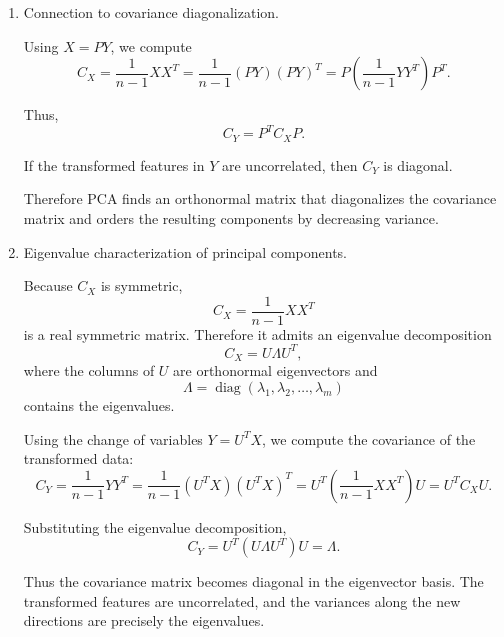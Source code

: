 \documentclass{article}
\begin{document}
\begin{enumerate}
We now seek an orthonormal basis that removes correlation and orders directions by variance.

Write
\[
X = U Y,
\qquad
\text{where } Y = U^T X.
\]

Here
\[
U =
[\vec{u}_1 \ \vec{u}_2 \ \dots \ \vec{u}_m]
\]
has orthonormal columns, and
\[
Y =
\begin{bmatrix}
\vec{y}_1^T \\
\vec{y}_2^T \\
\vdots \\
\vec{y}_m^T
\end{bmatrix}
\]
contains the transformed coordinates.

The columns of $U$ define new orthonormal directions in feature space. The rows of $Y$ represent the data expressed in those new coordinates.

The components in $Y$ are uncorrelated and are ordered in decreasing variance.

\item Connection to covariance diagonalization.

Using $X = P Y$, we compute
\[
C_X
=
\frac{1}{n-1} X X^T
=
\frac{1}{n-1} (P Y)(P Y)^T
=
P \left(
\frac{1}{n-1} Y Y^T
\right) P^T.
\]

Thus,
\[
C_Y = P^T C_X P.
\]

If the transformed features in $Y$ are uncorrelated, then $C_Y$ is diagonal.

Therefore PCA finds an orthonormal matrix that diagonalizes the covariance matrix and orders the resulting components by decreasing variance.

\item Eigenvalue characterization of principal components.

Because $C_X$ is symmetric,
\[
C_X = \frac{1}{n-1} X X^T
\]
is a real symmetric matrix. Therefore it admits an eigenvalue decomposition
\[
C_X = U \Lambda U^T,
\]
where the columns of $U$ are orthonormal eigenvectors and
\[
\Lambda = \operatorname{diag}(\lambda_1, \lambda_2, \dots, \lambda_m)
\]
contains the eigenvalues.

Using the change of variables $Y = U^T X$, we compute the covariance of the transformed data:
\[
C_Y
=
\frac{1}{n-1} Y Y^T
=
\frac{1}{n-1} (U^T X)(U^T X)^T
=
U^T \left( \frac{1}{n-1} X X^T \right) U
=
U^T C_X U.
\]

Substituting the eigenvalue decomposition,
\[
C_Y
=
U^T (U \Lambda U^T) U
=
\Lambda.
\]

Thus the covariance matrix becomes diagonal in the eigenvector basis. The transformed features are uncorrelated, and the variances along the new directions are precisely the eigenvalues.


\end{enumerate}
\end{document}
